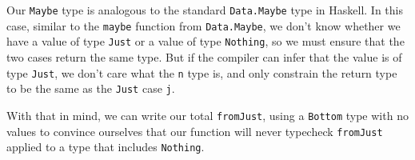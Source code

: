 \documentclass[]{article}
\newenvironment{Shaded}{}{}
\newcommand{\KeywordTok}[1]{\textcolor[rgb]{0.00,0.44,0.13}{\textbf{{#1}}}}
\newcommand{\DataTypeTok}[1]{\textcolor[rgb]{0.56,0.13,0.00}{{#1}}}
\newcommand{\StringTok}[1]{\textcolor[rgb]{0.25,0.44,0.63}{{#1}}}
\newcommand{\OtherTok}[1]{\textcolor[rgb]{0.00,0.44,0.13}{{#1}}}
\newcommand{\FunctionTok}[1]{\textcolor[rgb]{0.02,0.16,0.49}{{#1}}}
\newcommand{\NormalTok}[1]{{#1}}
\begin{document}
\begin{Shaded}
\end{Shaded}

Our \texttt{Maybe} type is analogous to the standard \texttt{Data.Maybe}
type in Haskell. In this case, similar to the \texttt{maybe} function
from \texttt{Data.Maybe}, we don't know whether we have a value of type
\texttt{Just} or a value of type \texttt{Nothing}, so we must ensure
that the two cases return the same type. But if the compiler can infer
that the value is of type \texttt{Just}, we don't care what the
\texttt{n} type is, and only constrain the return type to be the same as
the \texttt{Just} case \texttt{j}.

With that in mind, we can write our total \texttt{fromJust}, using a
\texttt{Bottom} type with no values to convince ourselves that our
function will never typecheck \texttt{fromJust} applied to a type that
includes \texttt{Nothing}.

\begin{Shaded}
\end{Shaded}
\end{document}
